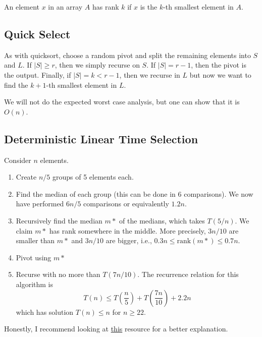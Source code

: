 \begin{definition}
    An element $x$ in an array $A$ has rank $k$ if $x$ is the $k$-th
    smallest element in $A$.
\end{definition}

\subsection{Quick Select}

As with quicksort, choose a random pivot and split the remaining
elements into $S$ and $L$. If $|S| \geq r$, then we simply recurse on
$S$. If $|S| = r - 1$, then the pivot is the output. Finally, if
$|S| = k < r - 1$, then we recurse in $L$ but now we want to find
the $k + 1$-th smallest element in $L$.

We will not do the expected worst case analysis, but one can show that
it is $O(n)$.

\subsection{Deterministic Linear Time Selection}

Consider $n$ elements.
 
\begin{enumerate}
    \item Create $n/5$ groups of 5 elements each.
    \item Find the median of each group (this can be done in 6
    comparisons). We now have performed $6n/5$ comparisons or equivalently $1.2n$.
    \item Recursively find the median $m*$ of the medians, which takes
    $T(5/n)$. We claim $m*$ has rank somewhere in the middle. More
    precisely, $3n/10$ are smaller than $m*$ and $3n/10$ are bigger,
    i.e., $0.3n \leq \text{rank}(m*) \leq 0.7n$.
    \item Pivot using $m*$
    \item Recurse with no more than $T(7n/10)$. The recurrence
    relation for this algorithm is 
    $$
    T(n) \leq T(\frac{n}{5}) +T(\frac{7n}{10}) + 2.2n
    $$
    which has solution $T(n) \leq n$ for $n \geq 22$.
\end{enumerate}


\begin{remark}
    Honestly, I recommend looking at
\href{http://www.cs.ust.hk/mjg_lib/Classes/COMP3711H_Fall16/lectures/Deterministic_Selection_Notes.pdf}{this} resource for a better explanation.
\end{remark}

